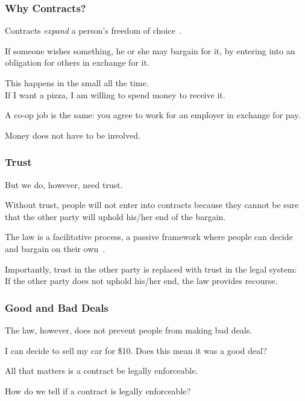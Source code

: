 \begin{frame}
\frametitle{Why Contracts?}

Contracts \textit{expand} a person's freedom of choice~\cite{lba}.

If someone wishes something, he or she may bargain for it, by entering into an obligation for others in exchange for it.

This happens in the small all the time.\\
\quad If I want a pizza, I am willing to spend money to receive it.

A co-op job is the same: you agree to work for an employer in exchange for pay.

Money does not have to be involved.

\end{frame}



\begin{frame}
\frametitle{Trust}

But we do, however, need \alert{trust}.

Without trust, people will not enter into contracts because they cannot be sure that the other party will uphold his/her end of the bargain.

The law is a facilitative process, a passive framework where people can decide and bargain on their own~\cite{lba}.

Importantly, trust in the other party is replaced with trust in the legal system:\\
\quad If the other party does not uphold his/her end, the law provides recourse.

\end{frame}



\begin{frame}
\frametitle{Good and Bad Deals}

The law, however, does not prevent people from making bad deals.

I can decide to sell my car for \$10. Does this mean it was a good deal?

All that matters is a contract be legally enforceable.

How do we tell if a contract is legally enforceable?

\end{frame}



